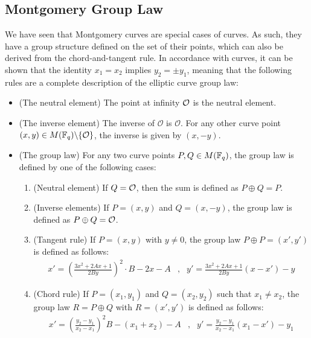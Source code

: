 \subsection{Montgomery Group Law} We have seen that Montgomery curves are special cases of  curves. As such, they have a group structure defined on the set of their points, which can also be derived from the chord-and-tangent rule. In accordance with  curves, it can be shown that the identity $x_1=x_2$ implies $y_2=\pm y_1$, meaning that the following rules are a complete description of the elliptic curve group law:

\begin{definition}\label{def:montgomery-group-law}

\begin{itemize}
\item (The neutral element) The point at infinity $\mathcal{O}$ is the neutral element.
\item (The inverse element) The inverse of $\mathcal{O}$ is $\mathcal{O}$. For any other curve point $(x,y) \in M(\mathbb{F}_q)\backslash \{\mathcal{O}\}$, the inverse is given by $(x,-y)$.
\item (The group law) For any two curve points $P, Q \in M(\mathbb{F}_q)$, the group law is defined by one of the following cases:
\begin{enumerate}
\item (Neutral element) If $Q=\mathcal{O}$, then the sum is defined as $P\oplus Q=P$.
\item (Inverse elements)  If $P=(x,y)$ and $Q=(x,-y)$, the group law is defined as $P\oplus Q=\mathcal{O}$.
\item (Tangent rule) If $P=(x,y)$ with $y\neq 0$, the group law $P\oplus P=(x',y')$ is defined as follows:
$$
\begin{array}{llr}
x' = (\frac{3x^2 + 2A x +1}{2By})^2\cdot B - 2x - A &,&
y' = \frac{3x^2 + 2A x +1}{2By}(x-x') - y
\end{array} 
$$
\item (Chord rule) If $P=(x_1,y_1)$ and $Q=(x_2,y_2)$ such that $x_1 \neq x_2$, the group law $R=P\oplus Q$ with $R=(x',y')$ is defined as follows:
$$
\begin{array}{llr}
x' = (\frac{y_2-y_1}{x_2-x_1})^2B - (x_1 + x_2) - A &, &
y' = \frac{y_2-y_1}{x_2-x_1}(x_1-x') - y_1
\end{array} 
$$
\end{enumerate}
\end{itemize}
\end{definition}
